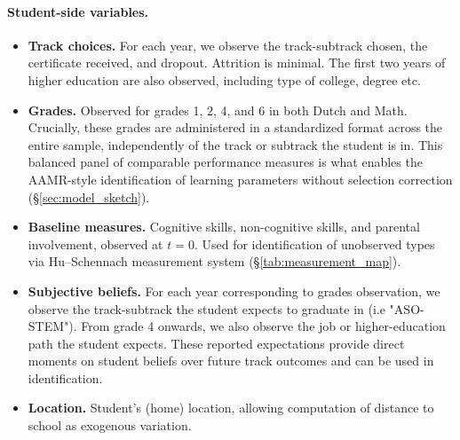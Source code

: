 \documentclass{article}
\begin{document}
\paragraph{Student-side variables.}
\begin{itemize}
  \item \textbf{Track choices.} For each year, we observe the track-subtrack chosen, the certificate received, and dropout. Attrition is minimal. The first two years of higher education are also observed, including type of college, degree etc.
  \item \textbf{Grades.} Observed for grades 1, 2, 4, and 6 in both Dutch and Math. Crucially, these grades are administered in a standardized format across the entire sample, independently of the track or subtrack the student is in. This balanced panel of comparable performance measures is what enables the AAMR-style identification of learning parameters without selection correction (\S\ref{sec:model_sketch}).
  \item \textbf{Baseline measures.} Cognitive skills, non-cognitive skills, and parental involvement, observed at $t=0$. Used for identification of unobserved types via Hu--Schennach measurement system (\S\ref{tab:measurement_map}).
  \item \textbf{Subjective beliefs.} For each year corresponding to grades observation, we observe the track-subtrack the student expects to graduate in (i.e "ASO-STEM"). From grade 4 onwards, we also observe the job or higher-education path the student expects. These reported expectations provide direct moments on student beliefs over future track outcomes and can be used in identification.
  \item \textbf{Location.} Student's (home) location, allowing computation of distance to school as exogenous variation.
\end{itemize}
\end{document}
